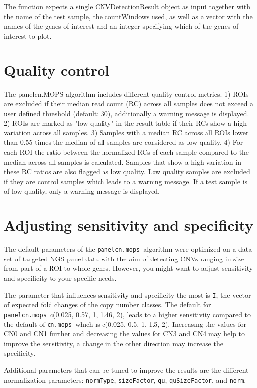 \documentclass[article]{bioinf}\usepackage[]{graphicx}\usepackage[]{color}
\newcommand{\panelcnmops}{\texttt{panelcn.mops}}
\newcommand{\cnmops}{\texttt{cn.mops}}
\begin{document}
The function expects a single CNVDetectionResult object as input together with 
the name of the test sample, the countWindows used, as well as a vector with 
the names of the genes of interest and an integer specifying which of the 
genes of interest to plot.

\section{Quality control}

The panelcn.MOPS algorithm includes different quality control metrics. 1) ROIs 
are excluded if their median read count (RC) across all samples does not exceed 
a user defined threshold (default: 30), additionally a warning message is 
displayed. 2) ROIs are marked as "low quality" in the result table if their RCs 
show a high variation across all samples. 3) Samples with a median RC across 
all ROIs lower than 0.55 times the median of all samples are considered as low 
quality. 4) For each ROI the ratio between the normalized RCs of each sample 
compared to the median across all samples is calculated. Samples that show a 
high variation in these RC ratios are also flagged as low quality. Low quality 
samples are excluded if they are control samples which leads to a warning 
message. If a test sample is of low quality, only a warning message is 
displayed. 

\section{Adjusting sensitivity and specificity}
The default parameters of the \panelcnmops\ algorithm were optimized on a data 
set of targeted NGS panel data with the aim of detecting CNVs ranging in size 
from part of a ROI to whole genes. However, you might want to adjust 
sensitivity and specificity to your specific needs.

The parameter that influences sensitivity and specificity the most is {\tt I}, 
the vector of expected fold changes of the copy number classes. The default for 
\panelcnmops\, c(0.025, 0.57, 1, 1.46, 2), leads to a higher sensitivity 
compared to the default of \cnmops\ which is c(0.025, 0.5, 1, 1.5, 2). 
Increasing the values for CN0 and CN1 further and decreasing the values for 
CN3 and CN4 may help to improve the sensitivity, a change in the other 
direction may increase the specificity.

Additional parameters that can be tuned to improve the results are the 
different normalization parameters: {\tt normType}, {\tt sizeFactor}, 
{\tt qu}, {\tt quSizeFactor}, and {\tt norm}.
\end{document}
